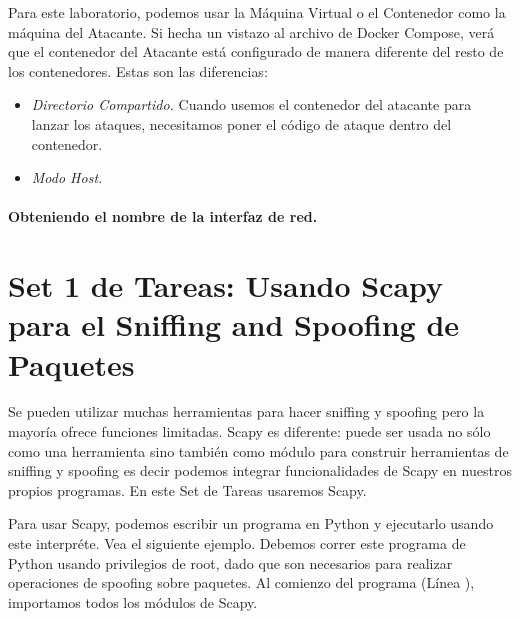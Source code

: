 Para este laboratorio, podemos usar la Máquina Virtual o el Contenedor como la máquina del Atacante. Si hecha un vistazo al archivo de Docker Compose, verá que el contenedor del Atacante está configurado de manera diferente del resto de los contenedores. 
Estas son las diferencias:


\begin{itemize}
\item \textit{Directorio Compartido.} Cuando usemos el contenedor del atacante para lanzar los ataques, necesitamos poner el código de ataque dentro del contenedor.




\item \textit{Modo Host.}

\end{itemize}


\paragraph{Obteniendo el nombre de la interfaz de red.}




\section{Set 1 de Tareas: Usando Scapy para el Sniffing and Spoofing de Paquetes}

Se pueden utilizar muchas herramientas para hacer sniffing y spoofing pero la mayoría ofrece funciones limitadas. Scapy es diferente: puede ser usada no sólo como una herramienta sino también como módulo para construir herramientas de sniffing y spoofing es decir podemos integrar funcionalidades de Scapy en nuestros propios programas. En este Set de Tareas usaremos Scapy.

Para usar Scapy, podemos escribir un programa en Python y ejecutarlo usando este interpréte. Vea el siguiente ejemplo. Debemos correr este programa de Python usando privilegios de root, dado que son necesarios para realizar operaciones de spoofing sobre paquetes.
Al comienzo del programa (Línea ), importamos todos los módulos de Scapy.

